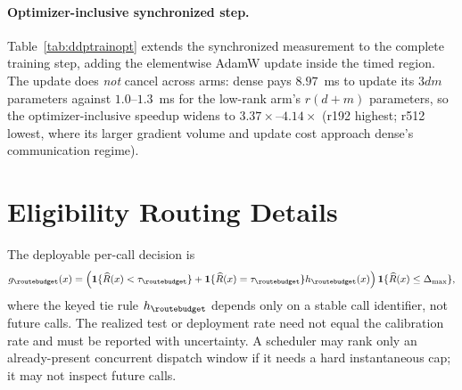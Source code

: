 \paragraph{Optimizer-inclusive synchronized step.}
Table~\ref{tab:ddptrainopt} extends the synchronized measurement to the
complete training step, adding the elementwise AdamW update inside the timed
region.  The update does \emph{not} cancel across arms: dense pays
$8.97$~ms to update its $3dm$ parameters against $1.0$--$1.3$~ms for the
low-rank arm's $r(d{+}m)$ parameters, so the optimizer-inclusive speedup
widens to $3.37\times$--$4.14\times$ (r192 highest; r512 lowest, where its
larger gradient volume and update cost approach dense's communication
regime).

\begin{table}[h]
\centering
\caption{Element-first state accounting and separate eight-process synthetic
all-reduce latency.  Factors use fp16; the legacy controller uses fp32.  The
collective is a proxy, not an integrated DDP step or HBM measurement.}
\label{tab:statecomm}
\end{table}

\section{Eligibility Routing Details}
\label{app:routing}

The deployable per-call decision is
\begin{equation}
g_{\routebudget}(x)=
\left(\mathbf 1\{\widehat R(x)<\tau_{\routebudget}\}
+\mathbf 1\{\widehat R(x)=\tau_{\routebudget}\}h_{\routebudget}(x)\right)
\mathbf 1\{\widehat R(x)\le\Delta_{\max}\},
\label{eq:router}
\end{equation}
where the keyed tie rule $h_{\routebudget}$ depends only on a stable call
identifier, not future calls. The realized test or deployment rate need not
equal the calibration rate and must be reported with uncertainty. A scheduler
may rank only an already-present concurrent dispatch window if it needs a hard
instantaneous cap; it may not inspect future calls.

